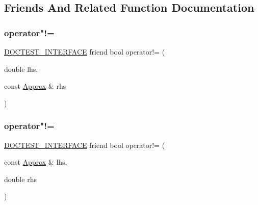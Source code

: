 \subsection{Friends And Related Function Documentation}
\mbox{\label{classdoctest_1_1Approx_a44d4bbc575291095c884848887538233}} 
\subsubsection{\texorpdfstring{operator"!=}{operator!=}\hspace{0.1cm}{\footnotesize\ttfamily [1/2]}}
{\footnotesize\ttfamily \hyperlink{doctest_8h_a9c16ffc635ec47f07797d21ede26b1a5}{D\+O\+C\+T\+E\+S\+T\+\_\+\+I\+N\+T\+E\+R\+F\+A\+CE} friend bool operator!= (\begin{DoxyParamCaption}\item[{double}]{lhs,  }\item[{const \hyperlink{classdoctest_1_1Approx}{Approx} \&}]{rhs }\end{DoxyParamCaption})\hspace{0.3cm}{\ttfamily [friend]}}

\mbox{\label{classdoctest_1_1Approx_ae86972ba14656f422afdcc60cd2cdb08}} 
\subsubsection{\texorpdfstring{operator"!=}{operator!=}\hspace{0.1cm}{\footnotesize\ttfamily [2/2]}}
{\footnotesize\ttfamily \hyperlink{doctest_8h_a9c16ffc635ec47f07797d21ede26b1a5}{D\+O\+C\+T\+E\+S\+T\+\_\+\+I\+N\+T\+E\+R\+F\+A\+CE} friend bool operator!= (\begin{DoxyParamCaption}\item[{const \hyperlink{classdoctest_1_1Approx}{Approx} \&}]{lhs,  }\item[{double}]{rhs }\end{DoxyParamCaption})\hspace{0.3cm}{\ttfamily [friend]}}

\mbox{\label{classdoctest_1_1Approx_acf32148e34dc6444a3bb4b16e7298279}} 

